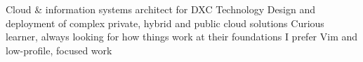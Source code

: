 
\begin{cvparagraph}

Cloud \& information systems architect for DXC Technology \newline
Design and deployment of complex private, hybrid and public cloud solutions \newline
Curious learner, always looking for how things work at their foundations \newline
I prefer Vim and low-profile, focused work
\end{cvparagraph}
